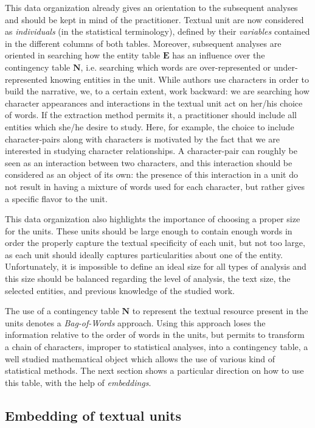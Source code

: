 \documentclass[
twocolumn,
]{ceurart}
\begin{document}
This data organization already gives an orientation to the subsequent analyses and should be kept in mind of the practitioner. Textual unit are now considered as \emph{individuals} (in the statistical terminology), defined by their \emph{variables} contained in the different columns of both tables. Moreover, subsequent analyses are oriented in searching how the entity table $\mathbf{E}$ has an influence over the contingency table $\mathbf{N}$, i.e. searching which words are over-represented or under-represented knowing entities in the unit. While authors use characters in order to build the narrative, we, to a certain extent, work backward: we are searching how character appearances and interactions in the textual unit act on her/his choice of words. If the extraction method permits it, a practitioner should include all entities which she/he desire to study. Here, for example, the choice to include character-pairs along with characters is motivated by the fact that we are interested in studying character relationships. A character-pair can roughly be seen as an interaction between two characters, and this interaction should be considered as an object of its own: the presence of this interaction in a unit do not result in having a mixture of words used for each character, but rather gives a specific flavor to the unit. 

This data organization also highlights the importance of choosing a proper size for the units. These units should be large enough to contain enough words in order the properly capture the textual specificity of each unit, but not too large, as each unit should ideally captures particularities about one of the entity. Unfortunately, it is impossible to define an ideal size for all types of analysis and this size should be balanced regarding the level of analysis, the text size, the selected entities, and previous knowledge of the studied work.

The use of a contingency table $\mathbf{N}$ to represent the textual resource present in the units denotes a \emph{Bag-of-Words} approach. Using this approach loses the information relative to the order of words in the units, but permits to transform a chain of characters, improper to statistical analyses, into a contingency table, a well studied mathematical object which allows the use of various kind of statistical methods. The next section shows a particular direction on how to use this table, with the help of \emph{embeddings}.

\subsection{Embedding of textual units}
\label{unit_embeddings}
\end{document}
